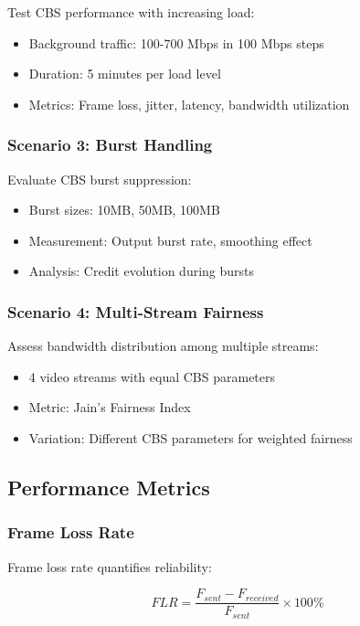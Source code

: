 \documentclass[10pt, journal, compsoc]{IEEEtran}
\begin{document}
Test CBS performance with increasing load:
\begin{itemize}
    \item Background traffic: 100-700 Mbps in 100 Mbps steps
    \item Duration: 5 minutes per load level
    \item Metrics: Frame loss, jitter, latency, bandwidth utilization
\end{itemize}

\subsubsection{Scenario 3: Burst Handling}

Evaluate CBS burst suppression:
\begin{itemize}
    \item Burst sizes: 10MB, 50MB, 100MB
    \item Measurement: Output burst rate, smoothing effect
    \item Analysis: Credit evolution during bursts
\end{itemize}

\subsubsection{Scenario 4: Multi-Stream Fairness}

Assess bandwidth distribution among multiple streams:
\begin{itemize}
    \item 4 video streams with equal CBS parameters
    \item Metric: Jain's Fairness Index
    \item Variation: Different CBS parameters for weighted fairness
\end{itemize}

\subsection{Performance Metrics}

\subsubsection{Frame Loss Rate}

Frame loss rate quantifies reliability:

\begin{equation}
FLR = \frac{F_{sent} - F_{received}}{F_{sent}} \times 100\%
\end{equation}
\end{document}
